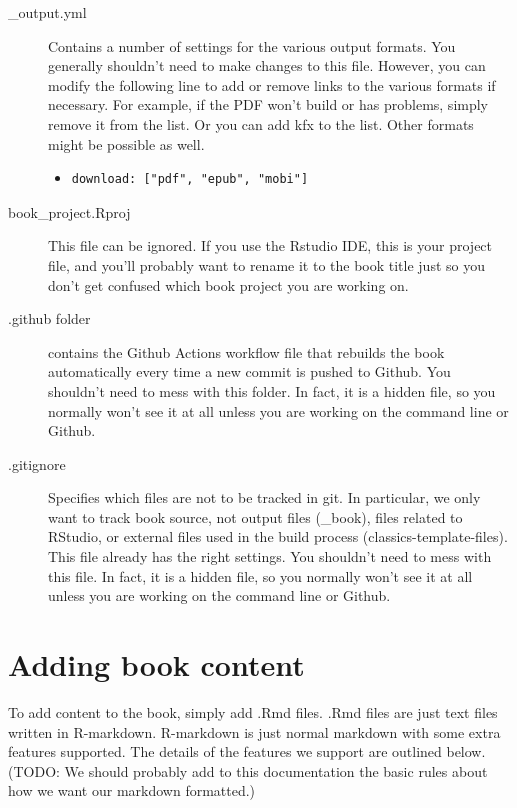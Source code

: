 \documentclass[
]{book}
\begin{document}
\begin{description}
\item[\_output.yml]
Contains a number of settings for the various output formats. You generally shouldn't need to make changes to this file. However, you can modify the following line to add or remove links to the various formats if necessary. For example, if the PDF won't build or has problems, simply remove it from the list. Or you can add kfx to the list. Other formats might be possible as well.

\begin{itemize}
\item
\begin{verbatim}
download: ["pdf", "epub", "mobi"]
\end{verbatim}
\end{itemize}
\item[book\_project.Rproj]
This file can be ignored. If you use the Rstudio IDE, this is your project file, and you'll probably want to rename it to the book title just so you don't get confused which book project you are working on.
\item[.github folder]
contains the Github Actions workflow file that rebuilds the book automatically every time a new commit is pushed to Github. You shouldn't need to mess with this folder. In fact, it is a hidden file, so you normally won't see it at all unless you are working on the command line or Github.
\item[.gitignore]
Specifies which files are not to be tracked in git. In particular, we only want to track book source, not output files (\_book), files related to RStudio, or external files used in the build process (classics-template-files). This file already has the right settings. You shouldn't need to mess with this file. In fact, it is a hidden file, so you normally won't see it at all unless you are working on the command line or Github.
\end{description}

\hypertarget{adding-book-content}{%
\section{Adding book content}\label{adding-book-content}}

To add content to the book, simply add .Rmd files. .Rmd files are just text files written in R-markdown. R-markdown is just normal markdown with some extra features supported. The details of the features we support are outlined below. (TODO: We should probably add to this documentation the basic rules about how we want our markdown formatted.)
\end{document}
